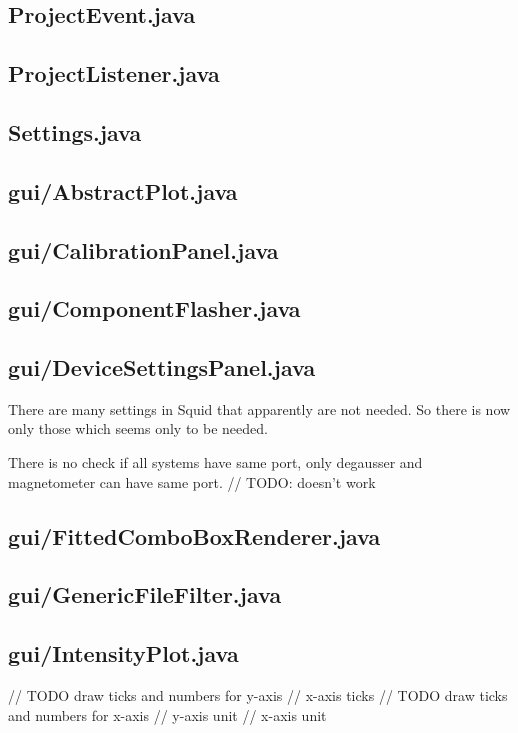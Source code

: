 \subsection{ProjectEvent.java}

\subsection{ProjectListener.java}

\subsection{Settings.java}

\subsection{gui/AbstractPlot.java}

\subsection{gui/CalibrationPanel.java}

\subsection{gui/ComponentFlasher.java}

\subsection{gui/DeviceSettingsPanel.java}

There are many settings in Squid that apparently are not needed. So there is now only those which seems only to be needed.

There is no check if all systems have same port, only degausser and magnetometer can have same port.
            // TODO: doesn't work

\subsection{gui/FittedComboBoxRenderer.java}

\subsection{gui/GenericFileFilter.java}

\subsection{gui/IntensityPlot.java}
        // TODO draw ticks and numbers for y-axis
        // x-axis ticks
        // TODO draw ticks and numbers for x-axis
        // y-axis unit
        // x-axis unit

